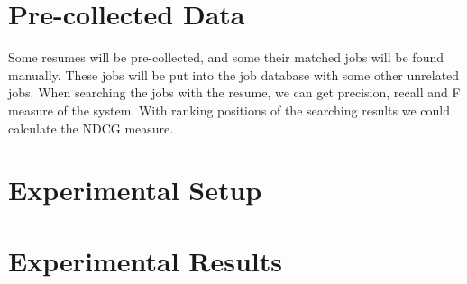 \section{Pre-collected Data}

Some resumes will be pre-collected, and some their matched jobs will be found manually. These jobs will be put into the job database with some other unrelated jobs.  When searching the jobs with the resume, we can get precision, recall and F measure of the system. With ranking positions of the searching results we could calculate the NDCG measure.

\section{Experimental Setup}



\section{Experimental Results}


